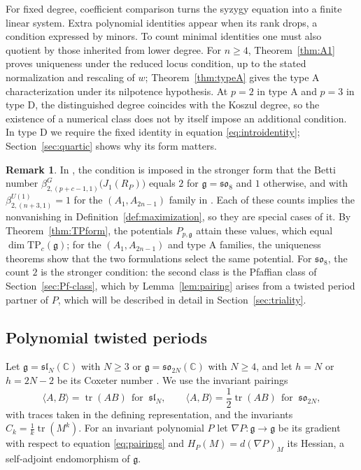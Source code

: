 \documentclass[10pt,reqno]{amsart}
\numberwithin{equation}{section}
\theoremstyle{plain}
\theoremstyle{definition}
\newtheorem{remark}[theorem]{Remark}
\DeclareMathOperator{\tr}{tr}
\newcommand{\TP}{\mathrm{TP}}
\newcommand{\ip}[2]{\langle #1, #2\rangle}
\begin{document}
For fixed degree, coefficient comparison turns the syzygy equation into a finite linear system. Extra polynomial identities appear when its rank drops, a condition expressed by minors. To count minimal identities one must also quotient by those inherited from lower degree. For $n\ge4$, Theorem~\ref{thm:A1} proves uniqueness under the reduced locus condition, up to the stated normalization and rescaling of $w$; Theorem~\ref{thm:typeA} gives the type A characterization under its nilpotence hypothesis. At $p=2$ in type A and $p=3$ in type D, the distinguished degree coincides with the Koszul degree, so the existence of a numerical class does not by itself impose an additional condition. In type D we require the fixed identity in equation \eqref{eq:introidentity}; Section~\ref{sec:quartic} shows why its form matters.

\begin{remark}\label{rem:count}
In \cite{Kang:2026ney}, the condition is imposed in the stronger form that the Betti number $\beta^{G}_{2,(p+c-1,1)}\big(J_1(R_P)\big)$ equals $2$ for $\mathfrak g=\mathfrak{so}_8$ and $1$ otherwise, and with $\beta^{U(1)}_{2,(n+3,1)}=1$ for the $(A_1,A_{2n-1})$ family in \cite{KLSnonpoint}. Each of these counts implies the nonvanishing in Definition~\ref{def:maximization}, so they are special cases of it. By Theorem~\ref{thm:TPform}, the potentials $P_{p,\mathfrak g}$ attain these values, which equal $\dim\TP_c(\mathfrak g)$; for the $(A_1,A_{2n-1})$ and type A families, the uniqueness theorems show that the two formulations select the same potential. For $\mathfrak{so}_8$, the count $2$ is the stronger condition: the second class is the Pfaffian class of Section~\ref{sec:Pf-class}, which by Lemma~\ref{lem:pairing} arises from a twisted period partner of $P$, which will be described in detail in Section~\ref{sec:triality}.
\end{remark}


\subsection{Polynomial twisted periods}\label{sec:TP}

Let $\mathfrak{g}=\mathfrak{sl}_N(\mathbb{C})$ with $N\ge3$ or $\mathfrak{g}=\mathfrak{so}_{2N}(\mathbb{C})$ with $N\ge4$, and let $h=N$ or $h=2N-2$ be its Coxeter number \cite{Humphreys}. We use the invariant pairings
\begin{equation}\label{eq:pairings}
	\ip AB=\tr(AB)\ \ \text{for}\;\;\mathfrak{sl}_N,\qquad \ip AB=\frac12\tr(AB)\ \ \text{for}\;\;\mathfrak{so}_{2N},
\end{equation}
with traces taken in the defining representation, and the invariants $C_k=\tfrac{1}{k}\tr(M^k)$. For an invariant polynomial $P$ let $\nabla P:\mathfrak{g}\to\mathfrak{g}$ be its gradient with respect to equation \eqref{eq:pairings} and $H_P(M)=d(\nabla P)_M$ its Hessian, a self-adjoint endomorphism of $\mathfrak{g}$.
\end{document}
